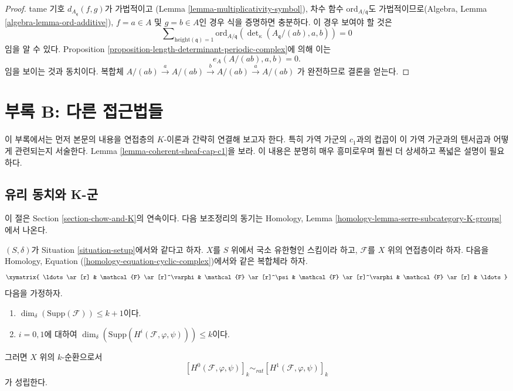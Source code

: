 \begin{proof}
tame 기호 $d_{A_{\mathfrak q}}(f, g)$가 가법적이고
(Lemma \ref{lemma-multiplicativity-symbol}), 차수 함수
$\text{ord}_{A/\mathfrak q}$도 가법적이므로(Algebra, Lemma
\ref{algebra-lemma-ord-additive}), $f = a \in A$ 및 $g = b \in A$인
경우 식을 증명하면 충분하다. 이 경우 보여야 할 것은
$$
\sum\nolimits_{\text{height}(\mathfrak q) = 1}
\text{ord}_{A/\mathfrak q}(\det\nolimits_\kappa(A_{\mathfrak q}/(ab), a, b))
= 0
$$
임을 알 수 있다. Proposition
\ref{proposition-length-determinant-periodic-complex}에 의해 이는
$$
e_A(A/(ab), a, b) = 0.
$$
임을 보이는 것과 동치이다. 복합체
$A/(ab) \xrightarrow{a} A/(ab) \xrightarrow{b} A/(ab) \xrightarrow{a} A/(ab)$
가 완전하므로 결론을 얻는다.
\end{proof}





\section{부록 B: 다른 접근법들}
\label{section-appendix-chow}

\noindent
이 부록에서는 먼저 본문의 내용을 연접층의 $K$-이론과 간략히
연결해 보고자 한다. 특히 가역 가군의 $c_1$과의 컵곱이 이 가역
가군과의 텐서곱과 어떻게 관련되는지 서술한다. Lemma
\ref{lemma-coherent-sheaf-cap-c1}을 보라. 이 내용은 분명히 매우
흥미로우며 훨씬 더 상세하고 폭넓은 설명이 필요하다.


\subsection{유리 동치와 K-군}
\label{subsection-rational-equivalence-K-groups}

\noindent
이 절은 Section \ref{section-chow-and-K}의 연속이다.
다음 보조정리의 동기는 Homology, Lemma
\ref{homology-lemma-serre-subcategory-K-groups}에서 나온다.

\begin{lemma}
\label{lemma-maps-between-coherent-sheaves}
$(S, \delta)$가 Situation \ref{situation-setup}에서와 같다고 하자.
$X$를 $S$ 위에서 국소 유한형인 스킴이라 하고,
$\mathcal{F}$를 $X$ 위의 연접층이라 하자. 다음을 Homology,
Equation (\ref{homology-equation-cyclic-complex})에서와 같은 복합체라
하자.
$$
\xymatrix{
\ldots \ar[r] &
\mathcal{F} \ar[r]^\varphi &
\mathcal{F} \ar[r]^\psi &
\mathcal{F} \ar[r]^\varphi &
\mathcal{F} \ar[r] & \ldots
}
$$
다음을 가정하자.
\begin{enumerate}
\item $\dim_\delta(\text{Supp}(\mathcal{F})) \leq k + 1$이다.
\item $i = 0, 1$에 대하여
$\dim_\delta(\text{Supp}(H^i(\mathcal{F}, \varphi, \psi))) \leq k$이다.
\end{enumerate}
그러면 $X$ 위의 $k$-순환으로서
$$
[H^0(\mathcal{F}, \varphi, \psi)]_k
\sim_{rat}
[H^1(\mathcal{F}, \varphi, \psi)]_k
$$
가 성립한다.
\end{lemma}

